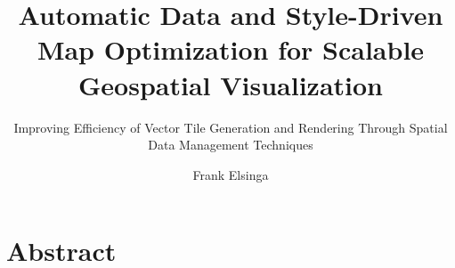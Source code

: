 \documentclass[
  a4paper,            %
  english,            %
]{tumbook}
\title{Automatic Data and Style-Driven Map Optimization for Scalable Geospatial Visualization}
\subtitle{Improving Efficiency of Vector Tile Generation and Rendering Through Spatial Data Management Techniques}
\author{Frank Elsinga}
\begin{document}
\frontmatter
\maketitle
\chapter{Abstract}

\tableofcontents

\mainmatter







\backmatter
\appendix


\printacronyms[name=Acronyms]
\listoffigures
\listoftables
\begin{sloppypar}
\printbibliography
\end{sloppypar}
\end{document}
